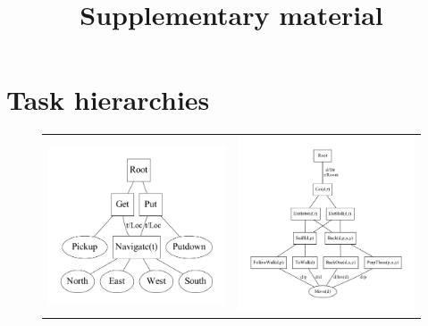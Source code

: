\documentclass[11pt]{article} %
\title{Supplementary material}
\date{} %
\begin{document}
\maketitle

\section{Task hierarchies}

 \begin{figure}[ht]
 \begin{tabular}{cc}
 & \multirow{2}{*}{\includegraphics[scale=0.5]{task/Hallway-Hierarchy.pdf}} \\
 \includegraphics[scale=0.27]{task/Taxi-Hierarchy.pdf} & \\

\end{tabular}
\end{figure}
\end{document}
